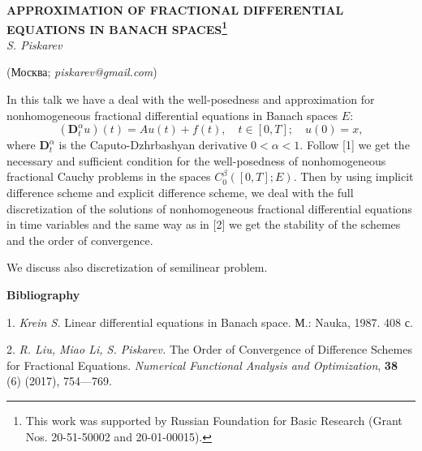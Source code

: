 
\begin{center}
    {\bf APPROXIMATION OF FRACTIONAL DIFFERENTIAL EQUATIONS IN BANACH SPACES\footnote{This work was supported by Russian Foundation for Basic Research
(Grant Nos. 20-51-50002 and  20-01-00015).}}\\

    {\it S. Piskarev}

    (Москва; {\it piskarev@gmail.com})
\end{center}


In this talk we have a deal with the  well-posedness and approximation for nonhomogeneous
 fractional differential equations in Banach spaces $E$:
 $$ (\mathbf{D}_{t}^{\alpha} u)(t) = A u(t) + f (t), \quad t \in [0,T];\quad
u(0)=x, $$
where $\mathbf{D}_{t}^{\alpha}$ is the Caputo-Dzhrbashyan derivative $0 < \alpha < 1.$
Follow [1] we get the necessary and sufficient condition for the well-posedness of
nonhomogeneous fractional Cauchy problems in the spaces $C_0^\beta([0,T];E)$.
Then by using implicit difference scheme and explicit difference scheme, we
deal with the full discretization of the solutions of nonhomogeneous
fractional differential equations in time variables and the same way as in [2] we
get the  stability of the schemes and the order of convergence.

We discuss also discretization of semilinear problem.


\smallskip \centerline {\bf Bibliography} \nopagebreak

1. {\it Krein S.} Linear differential equations in Banach space. М.: Nauka, 1987. 408 с.

2. {\it R. Liu, Miao Li, S. Piskarev.} The Order of Convergence of Difference Schemes for
Fractional Equations. {\em Numerical Functional Analysis and Optimization}, {\bf 38} (6)
(2017), 754---769.



